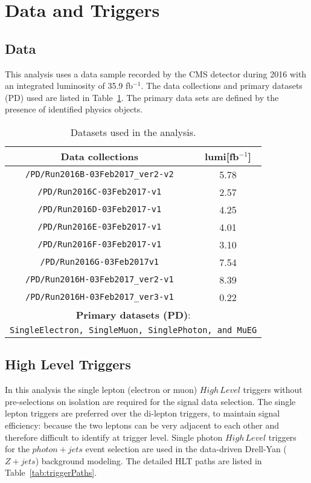\section{Data and Triggers}
\subsection{Data}
This analysis uses a data sample recorded by the CMS detector during 2016 with an integrated luminosity of 35.9 fb$^{-1}$. The data collections and primary datasets (PD) used are listed in Table~\ref{tab:samples_data}. The primary data sets are defined by the presence of identified physics objects.
\begin{table}[htbp]
\begin{small}
  \begin{center}
    \caption{Datasets used in the analysis. \label{tab:samples_data}}
    \begin{tabular}{c c}
      \hline\hline
      Data collections & lumi[fb$^{-1}$]  \\
      \hline
      \texttt{/PD/Run2016B-03Feb2017\_ver2-v2} &  5.78\\
      \texttt{/PD/Run2016C-03Feb2017-v1} &  2.57 \\
      \texttt{/PD/Run2016D-03Feb2017-v1} &  4.25 \\
      \texttt{/PD/Run2016E-03Feb2017-v1} &  4.01 \\
      \texttt{/PD/Run2016F-03Feb2017-v1} &  3.10 \\
      \texttt{/PD/Run2016G-03Feb2017v1}  &  7.54\\
      \texttt{/PD/Run2016H-03Feb2017\_ver2-v1} &  8.39 \\
      \texttt{/PD/Run2016H-03Feb2017\_ver3-v1} &  0.22 \\
      \hline
      \multicolumn{2}{c}{\textbf{Primary datasets (PD)}:} \\
      \multicolumn{2}{c}{\texttt{SingleElectron, SingleMuon, SinglePhoton, and MuEG}}\\ \hline
      \hline\hline
    \end{tabular}
  \end{center}
\end{small}
\end{table}

\subsection{High Level Triggers}\label{sec:samples_hlt}
In this analysis the single lepton (electron or muon) $High\,Level$ triggers without pre-selections on isolation are required for the signal data selection. The single lepton triggers are preferred over the di-lepton triggers, to maintain signal efficiency: because the two leptons can be very adjacent to each other and therefore difficult to identify at trigger level. Single photon $High\,Level$ triggers for the $photon+jets$ event selection are used in the data-driven Drell-Yan ($Z+jets$) background modeling. The detailed HLT paths are listed in Table~\ref{tab:triggerPaths}. 


